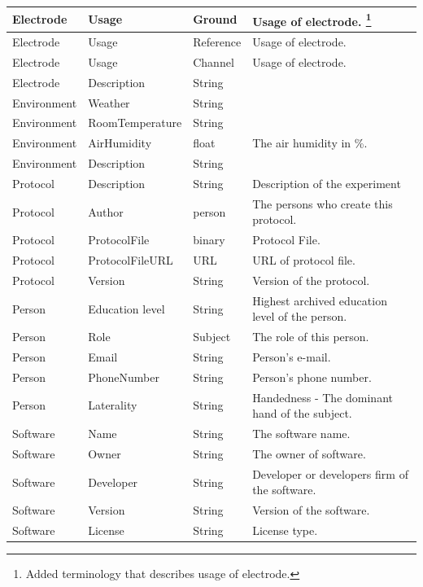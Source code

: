 \begin{longtable}{ | l | l | l | p{5cm} |}
\endlastfoot
		Electrode & Usage & Ground & Usage of electrode. \footnote{Added terminology that describes usage of electrode.}\\
		\hline
		Electrode & Usage & Reference&Usage of electrode.\footnotemark[\value{footnote}] \\ 
		\hline
		Electrode & Usage & Channel& Usage of electrode.\footnotemark[\value{footnote}]\\ 
		\hline
		Electrode & Description & String& \\ 
		\hline		
		Environment & Weather & String & \\ 
		\hline	 
		Environment & RoomTemperature & String & \\ 
		\hline
		Environment & AirHumidity & float & The air humidity in \%.\\ 
		\hline
		Environment & Description & String &  \\ 
		\hline
		Protocol & Description & String & Description of the experiment\\ 
		\hline
		Protocol & Author & person & The persons who create this protocol.\\ 
		\hline
		Protocol & ProtocolFile & binary & Protocol File.\\ 
		\hline
		Protocol & ProtocolFileURL & URL & URL of protocol file.\\ 
		\hline
		Protocol & Version & String & Version of the protocol.\\ 
		\hline
		Person & Education level & String & Highest archived education level of the person.\\ 
		\hline
		Person & Role & Subject & The role of this person.\\ 
		\hline
		Person & Email & String & Person's e-mail.\\ 
		\hline
		Person & PhoneNumber & String & Person's phone number.\\ 
		\hline
		Person & Laterality & String & Handedness - The dominant hand of the subject.\\ 
		\hline
		Software & Name & String & The software name.\\ 
		\hline
		Software & Owner & String & The owner of software.\\ 
		\hline
		Software & Developer & String & Developer or developers firm of the software.\\ 
		\hline
		Software & Version & String & Version of the software.\\ 
		\hline
		Software & License & String & License type.\\ 

\end{longtable}
